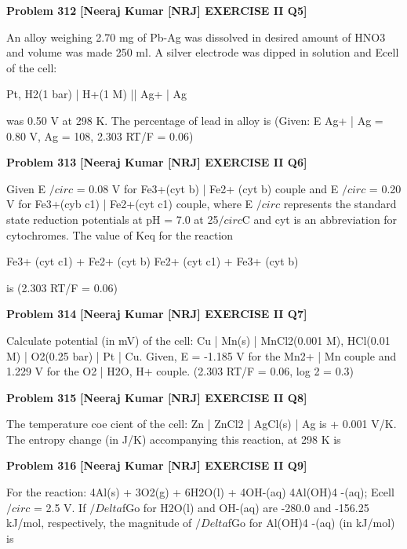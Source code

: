 \begin{problembox}
\textbf{Problem 312} \hfill \textbf{[Neeraj Kumar [NRJ] EXERCISE II Q5]}
\label{q:ext-nrj_all_questions-312}

An alloy weighing 2.70 mg of Pb-Ag was dissolved 
in desired amount of HNO3 and volume was made 
250 ml. A silver electrode was dipped in solution 
and Ecell of the cell:
 
  Pt, H2(1 bar) | H+(1 M) || Ag+ | Ag
 
 was 0.50 V at 298 K. The percentage of lead in 
alloy is (Given: E Ag+ | Ag = 0.80 V, Ag = 108, 2.303 
RT/F = 0.06)
\end{problembox}

\begin{problembox}
\textbf{Problem 313} \hfill \textbf{[Neeraj Kumar [NRJ] EXERCISE II Q6]}
\label{q:ext-nrj_all_questions-313}

Given E $/circ$ = 0.08 V for Fe3+(cyt b) | Fe2+ (cyt  b) 
couple and E $/circ$ = 0.20 V for Fe3+(cyb c1) | Fe2+(cyt 
c1) couple, where E $/circ$ represents the standard state 
reduction potentials at pH = 7.0 at 25$/circ$C and cyt is 
an abbreviation for cytochromes. The value of Keq 
for the reaction
 
   Fe3+ (cyt c1) + Fe2+ (cyt b)   Fe2+ (cyt c1) + Fe3+ 
(cyt b)
 
 is (2.303 RT/F = 0.06)
\end{problembox}

\begin{problembox}
\textbf{Problem 314} \hfill \textbf{[Neeraj Kumar [NRJ] EXERCISE II Q7]}
\label{q:ext-nrj_all_questions-314}

Calculate potential (in mV) of the cell: Cu | Mn(s) | 
MnCl2(0.001 M), HCl(0.01 M) | O2(0.25 bar) | Pt | 
Cu. Given, E  = -1.185 V for the Mn2+ | Mn couple 
and 1.229 V for the O2 | H2O, H+ couple. (2.303 
RT/F = 0.06, log 2 = 0.3)
\end{problembox}

\begin{problembox}
\textbf{Problem 315} \hfill \textbf{[Neeraj Kumar [NRJ] EXERCISE II Q8]}
\label{q:ext-nrj_all_questions-315}

The temperature coe   cient of the cell: Zn | ZnCl2 
| AgCl(s) | Ag is + 0.001 V/K. The entropy change 
(in J/K) accompanying this reaction, at 298 K is
\end{problembox}

\begin{problembox}
\textbf{Problem 316} \hfill \textbf{[Neeraj Kumar [NRJ] EXERCISE II Q9]}
\label{q:ext-nrj_all_questions-316}

For the reaction: 4Al(s) + 3O2(g) + 6H2O(l) + 
4OH-(aq)   4Al(OH)4
-(aq); Ecell
$/circ$ = 2.5 V. If $/Delta$fGo 
for H2O(l) and OH-(aq) are -280.0 and -156.25 
kJ/mol, respectively, the magnitude of $/Delta$fGo for 
Al(OH)4
-(aq) (in kJ/mol) is
\end{problembox}

